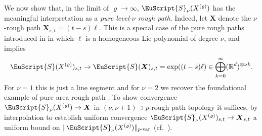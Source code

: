 \documentclass{article}
\newcommand{\var}[1]{{#1 \mathchar"2D \mathrm{var}}}
\newcommand{\bX}{\boldsymbol{X}}
\def\Sig{\EuScript{S}}
\numberwithin{equation}{section}
\theoremstyle{definition}
\theoremstyle{remark}
\begin{document}
We now show that, in the limit of $\varrho \to \infty$, $\Sig_\nu(X^{(\varrho)})$ has the meaningful interpretation as a \emph{pure level-$\nu$ rough path}. Indeed, let $\bX$ denote the $\nu$-rough path $\bX_{s,t} = (t-s)\ell$. This is a special case of the pure rough paths introduced in \cite{BGS20} in which $\ell$ is a homogeneous Lie polynomial of degree $\nu$, and \cite[Proposition 2.11]{BGS20} implies
\begin{equation}\label{eq:skipdeg}
\Sig(X^{(\varrho)})_{s,t} \to \Sig(\bX)_{s,t} = \exp((t-s)\ell) \in \bigoplus_{k = 0}^\infty (\mathbb R^d)^{\otimes \nu k} .
\end{equation}
For $\nu = 1$ this is just a line segment and for $\nu = 2$ we recover the foundational example of pure area rough path \cite[Example 1.1.1]{Lyo98}. To show convergence $\Sig_{\nu}(X^{(\varrho)}) \to \bX$ in $(\nu, \nu + 1) \ni p$-rough path topology it suffices, by interpolation \cite[Lemma 8.16]{FV10} to establish uniform convergence $\Sig_{\nu}(X^{(\varrho)})_{s,t} \to \bX_{s,t}$ a uniform bound on $\| \Sig_\nu(X^{(\varrho)}) \|_{\var{p}}$ (cf.\ \cite[Exercise 2.10]{FH20}).
\end{document}
